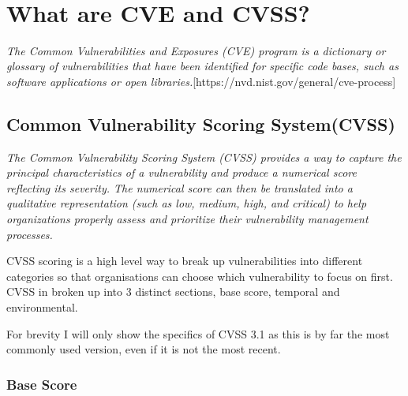 \documentclass[11pt]{article}
\begin{document}
 \\

\section{What are CVE and CVSS?}

\textit{The Common Vulnerabilities and Exposures (CVE) program is a dictionary or glossary of
	vulnerabilities that have been identified for specific code bases, such as software applications or
	open libraries.}[https://nvd.nist.gov/general/cve-process]

\subsection{Common Vulnerability Scoring System(CVSS)}

\textit{The Common Vulnerability Scoring System (CVSS) provides a way to capture the principal characteristics of a
	vulnerability and produce a numerical score reflecting its severity. The numerical score can then be translated
	into a qualitative representation (such as low, medium, high, and critical) to help organizations properly
	assess and prioritize their vulnerability management
	processes.}

CVSS scoring is a high level way to break up vulnerabilities into different categories so that
organisations can choose which vulnerability to focus on first. CVSS in broken up into 3 distinct sections, base score,
temporal and environmental.

For brevity I will only show the specifics of CVSS 3.1 as this is by far the most commonly used version, even if it is
not the most recent.

\subsubsection*{Base Score}
\end{document}
